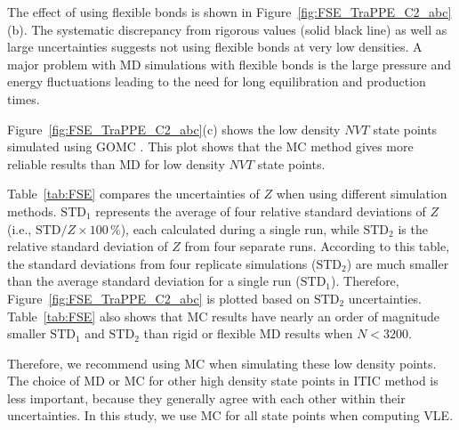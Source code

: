 \documentclass[5p,times]{elsarticle}
\begin{document}
The effect of using flexible bonds is shown in Figure~\ref{fig:FSE_TraPPE_C2_abc}(b). The systematic discrepancy from rigorous values (solid black line) as well as large uncertainties suggests not using flexible bonds at very low densities. A major problem with MD simulations with flexible bonds is the large pressure and energy fluctuations leading to the need for long equilibration and production times.


Figure~\ref{fig:FSE_TraPPE_C2_abc}(c) shows the low density $NVT$ state points simulated using GOMC \cite{Mick2013}. This plot shows that the MC method gives more reliable results than MD for low density $NVT$ state points. 

Table~\ref{tab:FSE} compares the uncertainties of $Z$ when using different simulation methods. $\mathrm{STD}_1$ represents the average of four relative standard deviations of $Z$ (i.e., $\mathrm{STD}/Z\times100 \, \%$), each calculated during a single run, while $\mathrm{STD}_2$ is the relative standard deviation of $Z$ from four separate runs. According to this table, the standard deviations from four replicate simulations ($\mathrm{STD}_2$) are much smaller than the average standard deviation for a single run ($\mathrm{STD}_1$). Therefore, Figure~\ref{fig:FSE_TraPPE_C2_abc} is plotted based on $\mathrm{STD}_2$ uncertainties. Table~\ref{tab:FSE} also shows that MC results have nearly an order of magnitude smaller $\mathrm{STD}_1$ and $\mathrm{STD}_2$ than rigid or flexible MD results when $N < 3200$.  

Therefore, we recommend using MC when simulating these low density points. The choice of MD or MC for other high density state points in ITIC method is less important, because they generally agree with each other within their uncertainties. In this study, we use MC for all state points when computing VLE.
\end{document}
